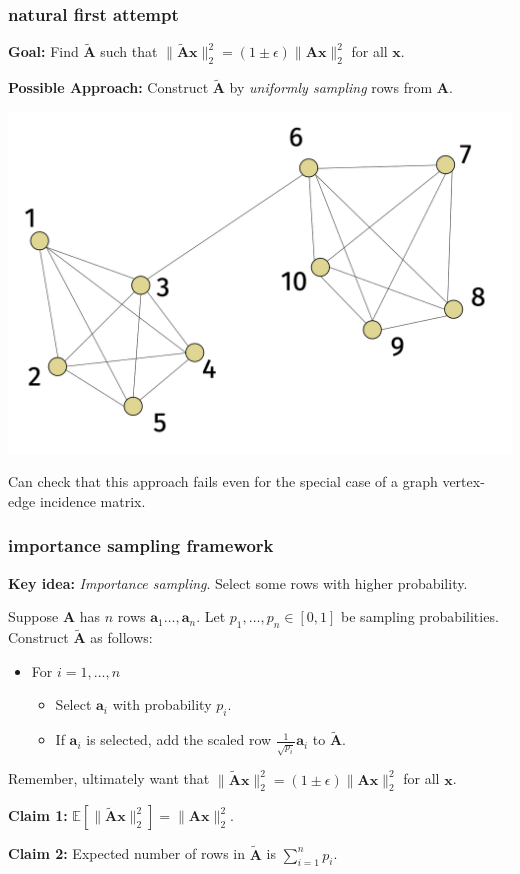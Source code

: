 \documentclass[compress]{beamer}
\newcommand{\bv}[1]{\mathbf{#1}}
\newcommand{\E}{\mathbb{E}}
\begin{document}
\begin{frame}[t]
	\frametitle{natural first attempt}
	\textbf{Goal:} Find $\tilde{\bv{A}}$ such that $\|\tilde{\bv{A}}\bv{x}\|_2^2 = (1\pm \epsilon)\|{\bv{A}}\bv{x}\|_2^2$ for all $\bv{x}$. 
	
	\textbf{Possible Approach:} Construct ${\tilde{\bv{A}}}$ by \emph{uniformly sampling} rows from $\bv{A}$. 
	
	\vspace{-2.5em}
	\begin{center}
		\includegraphics[width=.8\textwidth]{barbell.png}
		
		\vspace{-1.5em}
		Can check that this approach fails even for the special case of a graph vertex-edge incidence matrix. 
	\end{center}	
\end{frame}

\begin{frame}[t]
	\frametitle{importance sampling framework}
	\textbf{Key idea:} \emph{Importance sampling}. Select some rows with higher probability. 
	
	Suppose $\bv{A}$ has $n$ rows $\bv{a}_1\ldots, \bv{a}_n$. Let $p_1, \ldots, p_n \in [0,1]$ be sampling probabilities. Construct $\tilde{\bv{A}}$ as follows:
	\begin{itemize}
		\item For $i = 1,\ldots, n$
		\begin{itemize}
			\item Select $\bv{a}_i$ with probability $p_i$. 
			\item If $\bv{a}_i$ is selected, add the scaled row $\frac{1}{\sqrt{p_i}} \bv{a}_i$ to $\tilde{\bv{A}}$. 
		\end{itemize}
	\end{itemize}
	Remember, ultimately want that $\|\tilde{\bv{A}}\bv{x}\|_2^2 = (1\pm \epsilon)\|{\bv{A}}\bv{x}\|_2^2$ for all $\bv{x}$. 
	
	\textbf{Claim 1:} $\E[\|\tilde{\bv{A}}\bv{x}\|_2^2] = \|{\bv{A}}\bv{x}\|_2^2$. 
	\vspace{2em}
	
	
	\textbf{Claim 2:} Expected number of rows in $\tilde{\bv{A}}$ is $\sum_{i=1}^n p_i$. 
\end{frame}
\end{document}
